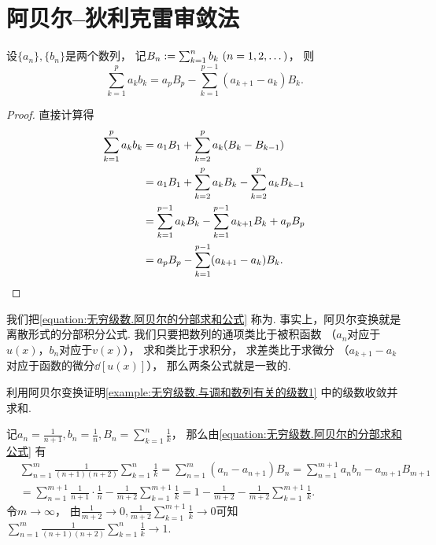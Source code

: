 \section{阿贝尔--狄利克雷审敛法}
\begin{lemma}[阿贝尔变换]
设\(\{a_n\},\{b_n\}\)是两个数列，
记\(B_n \defeq \sum_{k=1}^n b_k\ (n=1,2,\dotsc)\)，
则\begin{equation}\label{equation:无穷级数.阿贝尔的分部求和公式}
	\sum_{k=1}^p a_k b_k
	= a_p B_p - \sum_{k=1}^{p-1} (a_{k+1} - a_k) B_k.
\end{equation}
\begin{proof}
直接计算得\begin{align*}
	\sum_{k=1}^p a_k b_k
	&= a_1 B_1 + \sum_{k=2}^p a_k (B_k - B_{k-1}) \\
	&= a_1 B_1 + \sum_{k=2}^p a_k B_k - \sum_{k=2}^p a_k B_{k-1} \\
	&= \sum_{k=1}^{p-1} a_k B_k - \sum_{k=1}^{p-1} a_{k+1} B_k + a_p B_p \\
	&= a_p B_p - \sum_{k=1}^{p-1} (a_{k+1} - a_k) B_k.
	\qedhere
\end{align*}
\end{proof}
\end{lemma}
我们把\cref{equation:无穷级数.阿贝尔的分部求和公式} 称为.
事实上，阿贝尔变换就是离散形式的分部积分公式.
我们只要把数列的通项类比于被积函数
（\(a_n\)对应于\(u(x)\)，\(b_n\)对应于\(v(x)\)），
求和类比于求积分，
求差类比于求微分
（\(a_{k+1} - a_k\)对应于函数的微分\(\dd{[u(x)]}\)），
那么两条公式就是一致的.

\begin{example}
利用阿贝尔变换证明\cref{example:无穷级数.与调和数列有关的级数1} 中的级数收敛并求和.
\begin{solution}
记\(a_n = \frac1{n+1},
b_n = \frac1n,
B_n = \sum_{k=1}^n \frac1k\)，
那么由\cref{equation:无穷级数.阿贝尔的分部求和公式} 有\begin{align*}
	&\sum_{n=1}^m \frac1{(n+1)(n+2)} \sum_{k=1}^n \frac1k
	= \sum_{n=1}^m \left( a_n - a_{n+1} \right) B_n
	= \sum_{n=1}^{m+1} a_n b_n - a_{m+1} B_{m+1} \\
	&= \sum_{n=1}^{m+1} \frac1{n+1} \cdot \frac1n - \frac1{m+2} \sum_{k=1}^{m+1} \frac1k
	= 1 - \frac1{m+2} - \frac1{m+2} \sum_{k=1}^{m+1} \frac1k.
\end{align*}
令\(m\to\infty\)，
由\(\frac1{m+2} \to 0,
\frac1{m+2} \sum_{k=1}^{m+1} \frac1k \to 0\)可知
\(\sum_{n=1}^m \frac1{(n+1)(n+2)} \sum_{k=1}^n \frac1k \to 1\).
\end{solution}
\end{example}

